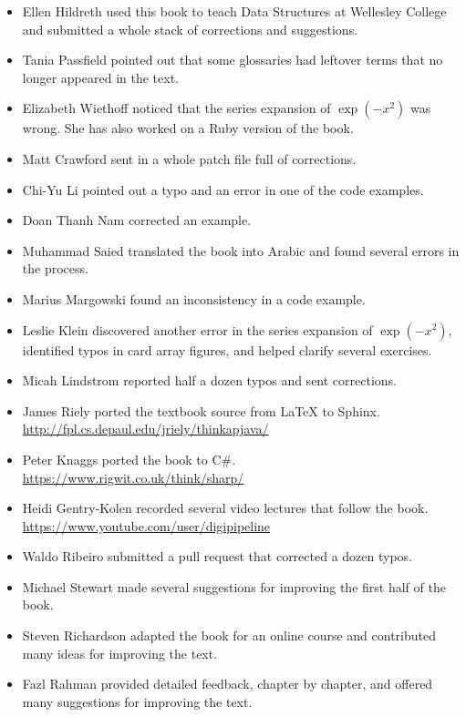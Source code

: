 \begin{itemize}

\item Ellen Hildreth used this book to teach Data Structures at Wellesley College and submitted a whole stack of corrections and suggestions.

\item Tania Passfield pointed out that some glossaries had leftover terms that no longer appeared in the text.

\item Elizabeth Wiethoff noticed that the series expansion of $\exp(-x^2)$ was wrong.
She has also worked on a Ruby version of the book.

\item Matt Crawford sent in a whole patch file full of corrections.

\item Chi-Yu Li pointed out a typo and an error in one of the code examples.

\item Doan Thanh Nam corrected an example.

\item Muhammad Saied translated the book into Arabic and found several errors in the process.

\item Marius Margowski found an inconsistency in a code example.

\item Leslie Klein discovered another error in the series expansion of $\exp(-x^2)$, identified typos in card array figures, and helped clarify several exercises.

\item Micah Lindstrom reported half a dozen typos and sent corrections.

\item James Riely ported the textbook source from LaTeX to Sphinx.
\\ \url{http://fpl.cs.depaul.edu/jriely/thinkapjava/}

\item Peter Knaggs ported the book to C\#.
\\ \url{https://www.rigwit.co.uk/think/sharp/}

\item Heidi Gentry-Kolen recorded several video lectures that follow the book.
\\ \url{https://www.youtube.com/user/digipipeline}

\item Waldo Ribeiro submitted a pull request that corrected a dozen typos.

\item Michael Stewart made several suggestions for improving the first half of the book.

\item Steven Richardson adapted the book for an online course and contributed many ideas for improving the text.

\item Fazl Rahman provided detailed feedback, chapter by chapter, and offered many suggestions for improving the text.
\end{itemize}

